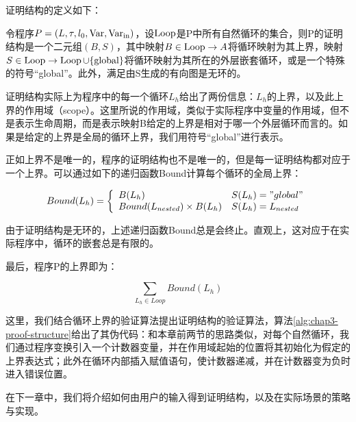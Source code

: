 证明结构的定义如下：

\begin{definition}
  \label{def:chap3-proof-structure}
  令程序$P = (L, \tau, l_0, \operatorname{Var},
  \operatorname{Var}_{\operatorname{in}})$，设$\operatorname{Loop}$是P中所有自然循环的集合，则P的证明结构是一个二元组$(B,
  S)$，其中映射$B \in \operatorname{Loop} \rightarrow
  A$将循环映射为其上界，映射$S \in \operatorname{Loop} \rightarrow
  \operatorname{Loop} \cup \{ \operatorname{global}
  \}$将循环映射为其所在的外层嵌套循环，或是一个特殊的符号“global”。此外，满足由S生成的有向图是无环的。
\end{definition}

证明结构实际上为程序中的每一个循环$L_h$给出了两份信息：$L_h$的上界，以及此上界的作用域（scope）。这里所说的作用域，类似于实际程序中变量的作用域，但不是表示生命周期，而是表示映射B给定的上界是相对于哪一个外层循环而言的。如果是给定的上界是全局的循环上界，我们用符号“global”进行表示。

正如上界不是唯一的，程序的证明结构也不是唯一的，但是每一证明结构都对应于一个上界。可以通过如下的递归函数Bound计算每个循环的全局上界：

\begin{equation}
    Bound(L_h) = \left\{ \begin{array}{ll}
       B(L_h) & S(L_h) = "global"\\
       Bound(L_{nested}) \times B(L_h) & S(L_h) = L_{nested}
     \end{array} \right.
\end{equation}

由于证明结构是无环的，上述递归函数Bound总是会终止。直观上，这对应于在实际程序中，循环的嵌套总是有限的。

最后，程序P的上界即为：

\begin{equation}
\sum_{L_h \in Loop} Bound(L_h)
\end{equation}

这里，我们结合循环上界的验证算法提出证明结构的验证算法，算法\ref{alg:chap3-proof-structure}给出了其伪代码：和本章前两节的思路类似，对每个自然循环，我们通过程序变换引入一个计数器变量，并在作用域起始的位置将其初始化为假定的上界表达式；此外在循环内部插入赋值语句，使计数器递减，并在计数器变为负时进入错误位置。

在下一章中，我们将介绍如何由用户的输入得到证明结构，以及在实际场景的策略与实现。

